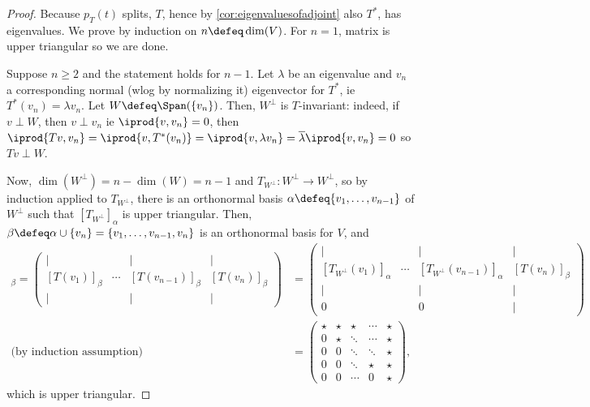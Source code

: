 \begin{proof}
    Because $p_T(t)$ splits, $T$, hence by \cref{cor:eigenvaluesofadjoint} also $T^\ast$, has eigenvalues. We prove by induction on $n \defeq \dim(V)$. For $n = 1$, matrix is upper triangular so we are done.
    
    Suppose $n \geq 2$ and the statement holds for $n - 1$. Let $\lambda$ be an eigenvalue and $v_n$ a corresponding normal (wlog by normalizing it) eigenvector for $T^\ast$, ie $T^\ast(v_n) = \lambda v_n$. Let $W \defeq \Span(\{v_n\})$. Then, $W^\perp$ is $T$-invariant: indeed, if $v \perp W$, then $v \perp v_n$ ie $\iprod{v, v_n} =0$, then $\iprod{Tv, v_n} = \iprod{v, T^\ast (v_n)} = \iprod{v, \lambda v_n} = \overline{\lambda} \iprod{v, v_n} = 0$ so $Tv \perp W$. 
    
    Now, $\dim(W^\perp) = n - \dim(W) = n - 1$ and $T_{W^\perp} : W^\perp \to W^\perp$, so by induction applied to $T_{W^\perp}$, there is an orthonormal basis $\alpha \defeq \{v_1, \dots, v_{n-1}\}$ of $W^\perp$ such that $[T_{W^\perp}]_\alpha$ is upper triangular. Then, $\beta \defeq \alpha \cup \{v_n\} = \{v_1, \dots, v_{n - 1}, v_{n}\}$ is an orthonormal basis for $V$, and \begin{align*}
        [T]_\beta = \begin{pmatrix}
            \vert  & & \vert & \vert \\
            [T(v_1)]_\beta & \cdots & [T(v_{n-1})]_\beta & [T(v_{n})]_\beta \\
            \vert  & & \vert & \vert 
        \end{pmatrix} &= \begin{pmatrix}
            \vert  & & \vert & \vert \\
            [T_{W^\perp}(v_1)]_\alpha & \cdots & [T_{W^\perp}(v_{n-1})]_\alpha & [T(v_{n})]_\beta \\
            \vert  & & \vert & \vert \\
            0 & & 0 & \vert
        \end{pmatrix}\\
\text{(by induction assumption)} \qquad &= \begin{pmatrix}
    \star & \star & \star & \cdots  & \star \\
    0 & \star & \ddots &  \cdots & \star\\
    0 & 0&\ddots  & \ddots & \star\\
    0 & 0 & \ddots  & \star& \star\\
    0 & 0 & \cdots & 0 & \star
\end{pmatrix},
    \end{align*}
    which is upper triangular.
\end{proof}

